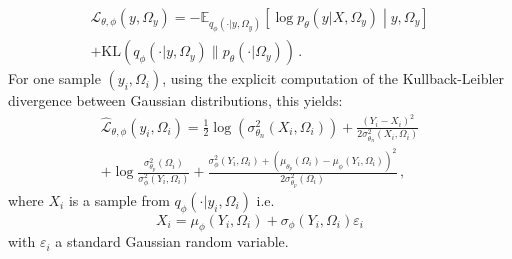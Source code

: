\documentclass[review]{cvpr}
\begin{document}
\begin{multline*}
 \mathcal{L}_{\theta,\phi}(y,\Omega_y)  =   -\mathbb{E}_{q_{\phi}(\cdot|y,\Omega_y)}\left[\log p_\theta(y|X,\Omega_y)\middle |y,\Omega_y\right] \\ + \mathrm{KL}\left(q_{\phi}(\cdot|y,\Omega_y)\| p_\theta(\cdot|\Omega_y)\right)\,.
\end{multline*}
For one sample $(y_i,\Omega_i)$, using the explicit computation of the  Kullback-Leibler divergence between Gaussian distributions, this yields:
\begin{multline*}
\widehat{\mathcal{L}}_{\theta,\phi}(y_i,\Omega_i)  =   \frac{1}{2}\log(\sigma^2_{\theta_n}(X_i,\Omega_i)) + \frac{(Y_i-X_i)^2}{2\sigma^2_{\theta_n}(X_i,\Omega_i)} \\ + \log\frac{\sigma^2_{\theta_p}(\Omega_i)}{\sigma^2_{\phi}(Y_i,\Omega_i)} + \frac{\sigma^2_{\phi}(Y_i,\Omega_i) + \left(\mu_{\theta_p}(\Omega_i) - \mu_\phi(Y_i,\Omega_i)\right)^2}{2\sigma^2_{\theta_p}(\Omega_i)}\,,
\end{multline*}
where $X_i$ is a sample from $q_\phi(\cdot|y_i,\Omega_i)$ i.e. 
$$
X_i = \mu_\phi(Y_i,\Omega_i) + \sigma_\phi(Y_i,\Omega_i)\varepsilon_i
$$
with $\varepsilon_i$ a standard Gaussian random variable.

\end{document}
